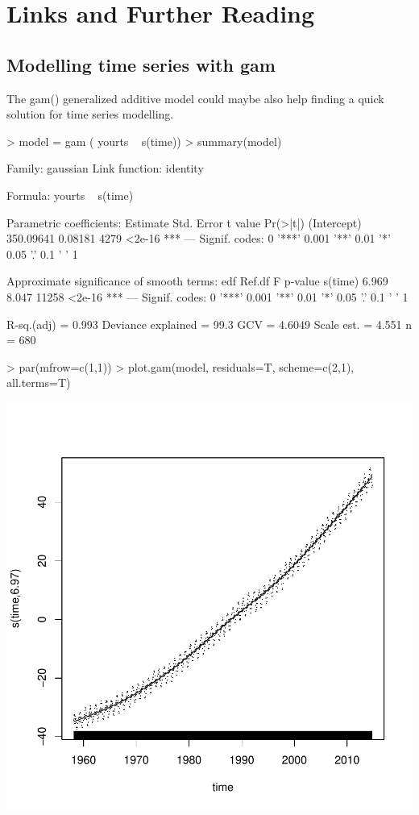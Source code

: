 \documentclass[11pt, a4paper]{article} %
\begin{document}
\section{Links and Further Reading}%


\subsection{Modelling time series with gam}

The gam() generalized additive model could maybe also help finding a quick solution for time series modelling. 

\begin{Schunk}
\begin{Sinput}
> model = gam ( yourts ~ s(time))
> summary(model)
\end{Sinput}
Family: gaussian 
Link function: identity 

Formula:
yourts ~ s(time)

Parametric coefficients:
             Estimate Std. Error t value Pr(>|t|)    
(Intercept) 350.09641    0.08181    4279   <2e-16 ***
---
Signif. codes:  
0 '***' 0.001 '**' 0.01 '*' 0.05 '.' 0.1 ' ' 1

Approximate significance of smooth terms:
          edf Ref.df     F p-value    
s(time) 6.969  8.047 11258  <2e-16 ***
---
Signif. codes:  
0 '***' 0.001 '**' 0.01 '*' 0.05 '.' 0.1 ' ' 1

R-sq.(adj) =  0.993   Deviance explained = 99.3%
GCV = 4.6049  Scale est. = 4.551     n = 680\end{Schunk}

\begin{Schunk}
\begin{Sinput}
> par(mfrow=c(1,1))
> plot.gam(model, residuals=T, scheme=c(2,1), all.terms=T)
\end{Sinput}
\end{Schunk}
\includegraphics{alleselena-067}
\end{document}
